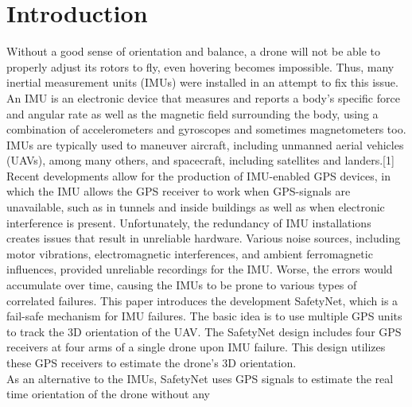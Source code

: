 \documentclass[journal,onecolumn]{IEEEtran}
\begin{document}
\section{Introduction}
%
%
%
%
Without a good sense of orientation and balance, a drone will not be able to properly adjust its rotors to fly, even hovering becomes impossible.
Thus, many inertial measurement units (IMUs) were installed in an attempt to fix this issue.
An IMU is an electronic device that measures and reports a body’s specific force and angular rate as well as the magnetic field
surrounding the body, using a combination of accelerometers and gyroscopes and sometimes magnetometers too.\\
IMUs are typically used to maneuver aircraft, including unmanned aerial vehicles
(UAVs), among many others, and spacecraft, including satellites and landers.[1]\\
Recent developments allow for the production of IMU-enabled GPS devices, in which the IMU allows the GPS receiver to work when GPS-signals are unavailable, such as in tunnels and inside buildings as well as when electronic
interference is present. Unfortunately, the redundancy of IMU installations creates issues that result in unreliable hardware. Various noise sources, including
motor vibrations, electromagnetic interferences, and ambient ferromagnetic influences, provided unreliable recordings for the IMU. Worse, the errors would accumulate over time, causing the IMUs to be prone to various types of correlated failures.
This paper introduces the development SafetyNet, which is a fail-safe mechanism for IMU failures. The basic idea is to use multiple GPS units to track the 3D orientation of the UAV. The SafetyNet design includes four GPS receivers at four arms of a single drone upon IMU
failure. This design utilizes these GPS receivers to estimate the drone's 3D orientation.\\
As an alternative to the IMUs, SafetyNet uses GPS signals to estimate the real time orientation of the drone without any
\end{document}
